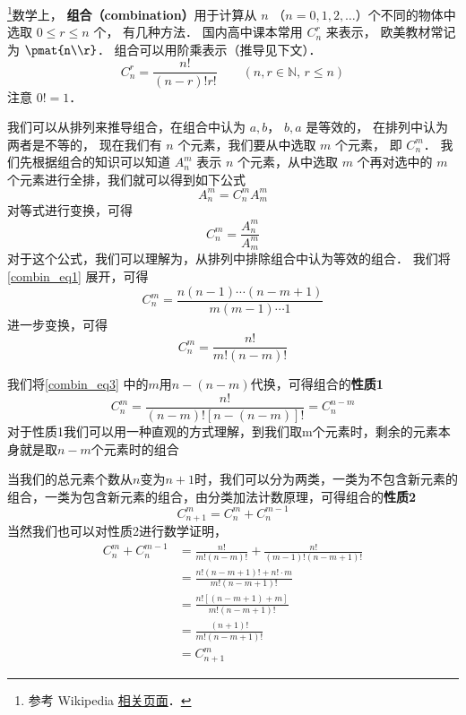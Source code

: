 
\begin{issues}
\issueDraft
\end{issues}


\footnote{参考 Wikipedia \href{https://en.wikipedia.org/wiki/Combination}{相关页面}．}数学上， \textbf{组合（combination）}用于计算从 $n$ （$n = 0, 1, 2, \dots$）个不同的物体中选取 $0 \leqslant r \leqslant n$ 个， 有几种方法． 国内高中课本常用 $C_n^r$ 来表示， 欧美教材常记为 $\pmat{n\\r}$． 组合可以用阶乘表示（推导见下文）．
\begin{equation}
C_n^r = \frac{n!}{(n-r)!r!} \qquad (n, r \in \mathbb N,\, r \leqslant n)
\end{equation}
注意 $0! = 1$．

我们可以从排列来推导组合，在组合中认为 ${a,b}$， ${b,a}$ 是等效的， 在排列中认为两者是不等的， 现在我们有 $n$ 个元素，我们要从中选取 $m$ 个元素， 即 $C_n^m$．
我们先根据组合的知识可以知道 $A_n^m$ 表示 $n$ 个元素，从中选取 $m$ 个再对选中的 $m$ 个元素进行全排，我们就可以得到如下公式
\begin{equation}
A_n^m = C_n^m A_m^m
\end{equation}
对等式进行变换，可得
\begin{equation}\label{combin_eq1}
C_n^m = \frac{A_n^m}{A_m^m}
\end{equation}
对于这个公式，我们可以理解为，从排列中排除组合中认为等效的组合．
我们将\autoref{combin_eq1} 展开，可得
\begin{equation}\label{combin_eq2}
C_n^m = \frac{n(n - 1) \cdots (n - m + 1)}{m(m-1)\cdots 1}
\end{equation}
进一步变换，可得
\begin{equation}\label{combin_eq3}
C_n^m = \frac{n!}{m!(n-m)!}
\end{equation}

我们将\autoref{combin_eq3} 中的$m$用$n-(n-m)$代换，可得组合的\textbf{性质1}
\begin{equation}
C_n^m = \frac{n!}{(n-m)![n-(n-m)]!} = C_n^{n-m}
\end{equation}
对于性质1我们可以用一种直观的方式理解，到我们取m个元素时，剩余的元素本身就是取$n-m$个元素时的组合

当我们的总元素个数从$n$变为$n+1$时，我们可以分为两类，一类为不包含新元素的组合，一类为包含新元素的组合，由分类加法计数原理，可得组合的\textbf{性质2}
\begin{equation}
C_{n + 1}^m = C_n^m + C_n^{m - 1}
\end{equation}
当然我们也可以对性质2进行数学证明，
\begin{equation}
\begin{aligned}
C_n^m + C_n^{m - 1} &= \frac{n!}{m!(n-m)!} + \frac{n!}{(m - 1)!(n - m + 1)!}\\
&=\frac{n!(n - m + 1)! + n!\cdot m}{m!(n - m + 1)!}\\
&=\frac{n![(n - m + 1) + m]}{m!(n - m + 1)!}\\
&=\frac{(n + 1)!}{m!(n - m + 1)!}\\
&=C_{n+1}^m
\end{aligned}
\end{equation}